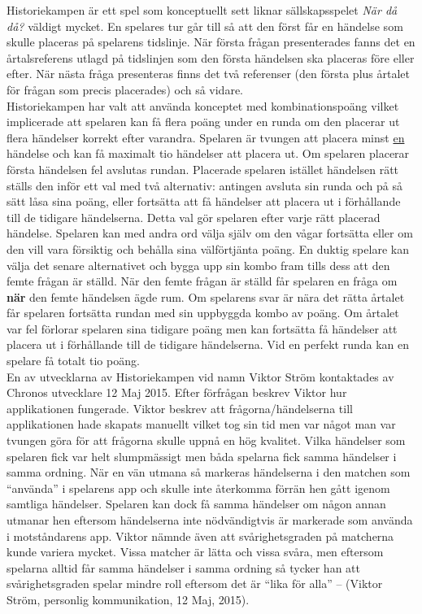 \documentclass[a4paper, 11pt]{article}
\begin{document}
Historiekampen är ett spel som konceptuellt sett liknar sällskapsspelet \textit{När då då?} väldigt mycket. En spelares tur går till så att den först får en händelse som skulle placeras på spelarens tidslinje. När första frågan presenterades fanns det en årtalsreferens utlagd på tidslinjen som den första händelsen ska placeras före eller efter. När nästa fråga presenteras finns det två referenser (den första plus årtalet för frågan som precis placerades) och så vidare.\\ 
Historiekampen har valt att använda konceptet med kombinationspoäng vilket implicerade att spelaren kan få flera poäng under en runda om den placerar ut flera händelser korrekt efter varandra. Spelaren är tvungen att placera minst \underline{en} händelse och kan få maximalt tio händelser att placera ut. Om spelaren placerar första händelsen fel avslutas rundan. Placerade spelaren istället händelsen rätt ställs den inför ett val med två alternativ: antingen avsluta sin runda och på så sätt låsa sina poäng, eller fortsätta att få händelser att placera ut i förhållande till de tidigare händelserna. Detta val gör spelaren efter varje rätt placerad händelse. Spelaren kan med andra ord välja själv om den vågar fortsätta eller om den vill vara försiktig och behålla sina välförtjänta poäng. En duktig spelare kan välja det senare alternativet och bygga upp sin kombo fram tills dess att den femte frågan är ställd. När den femte frågan är ställd får spelaren en fråga om \textbf{när} den femte händelsen ägde rum. Om spelarens svar är nära det rätta årtalet får spelaren fortsätta rundan med sin uppbyggda kombo av poäng. Om årtalet var fel förlorar spelaren sina tidigare poäng men kan fortsätta få händelser att placera ut i förhållande till de tidigare händelserna. Vid en perfekt runda kan en spelare få totalt tio poäng.\\

En av utvecklarna av Historiekampen vid namn Viktor Ström kontaktades av Chronos utvecklare 12 Maj 2015. Efter förfrågan beskrev Viktor hur applikationen fungerade. Viktor beskrev att frågorna/händelserna till applikationen hade skapats manuellt vilket tog sin tid men var något man var tvungen göra för att frågorna skulle uppnå en hög kvalitet. Vilka händelser som spelaren fick var helt slumpmässigt men båda spelarna fick samma händelser i samma ordning. När en vän utmana så markeras händelserna i den matchen som ``använda'' i spelarens app och skulle inte återkomma förrän hen gått igenom samtliga händelser. Spelaren kan dock få samma händelser om någon annan utmanar hen eftersom händelserna inte nödvändigtvis är markerade som använda i motståndarens app. 
Viktor nämnde även att svårighetsgraden på matcherna kunde variera mycket. Vissa matcher är lätta och vissa svåra, men eftersom spelarna alltid får samma händelser i samma ordning så tycker han att svårighetsgraden spelar mindre roll eftersom det är ``lika för alla'' -- (Viktor Ström, personlig kommunikation, 12 Maj, 2015). 
\end{document}
